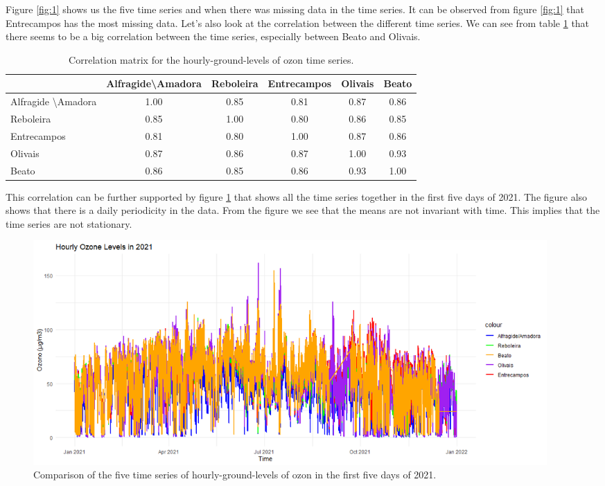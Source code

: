 \documentclass{article}
\begin{document}
Figure \ref{fig:1} shows us the five time series and when there was missing data in the time series. It can be observed from figure \ref{fig:1} that Entrecampos has the most missing data.  Let's also look at the correlation between the different time series. We can see from table \ref{tab:correlation} that there seems to be a big correlation between the time series, especially between Beato and Olivais.

\begin{table}
  \centering
  \begin{tabular}{|l|c|c|c|c|c|} \hline
    & Alfragide\textbackslash Amadora & Reboleira & Entrecampos & Olivais & Beato \\ \hline

    Alfragide \textbackslash Amadora & 1.00 & 0.85 & 0.81 & 0.87 & 0.86 \\ \hline
    Reboleira & 0.85 & 1.00 & 0.80 & 0.86 & 0.85 \\ \hline
    Entrecampos & 0.81 & 0.80 & 1.00 & 0.87 & 0.86 \\ \hline
    Olivais & 0.87 & 0.86 & 0.87 & 1.00 & 0.93 \\ \hline
    Beato & 0.86 & 0.85 & 0.86 & 0.93 & 1.00 \\ \hline
  \end{tabular}
  \caption{Correlation matrix for the hourly-ground-levels of ozon time series.}
  \label{tab:correlation}
\end{table}

This correlation can be further supported by figure \ref{fig:2} that shows all the time series together in the first five days of 2021. The figure also shows that there is a daily periodicity in the data. From the figure we see that the means are not invariant with time. This implies that the time series are not stationary. 

\begin{figure}[ht!]
    \centering
    \includegraphics[width=0.95\textwidth]{Plots1/eda6.png}
    \caption{Comparison of the five time series of hourly-ground-levels of ozon in the first five days of 2021.}
    \label{fig:2}
\end{figure}
\end{document}

